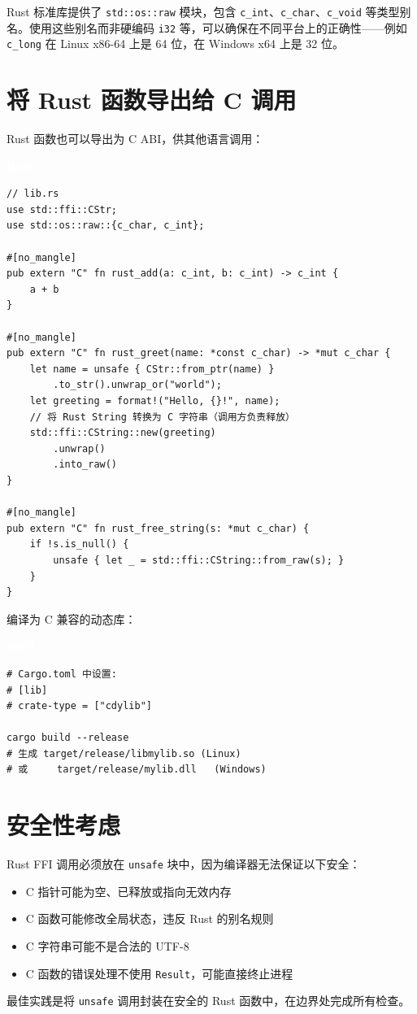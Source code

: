 \documentclass[12pt,a4paper,fontset=fandol]{ctexbook}
\newcommand{\rustlabel}{%
  \begin{tcolorbox}[enhanced,colback=rustheadbg,colframe=rustheadbg,
    arc=1mm,boxrule=0mm,left=6pt,right=6pt,top=2pt,bottom=2pt,
    halign=left,oversize]
    \textcolor{white}{\small\bfseries Rust}
  \end{tcolorbox}\vspace{-4pt}}
\newcommand{\bashlabel}{%
  \begin{tcolorbox}[enhanced,colback=black!80,colframe=black!80,
    arc=1mm,boxrule=0mm,left=6pt,right=6pt,top=2pt,bottom=2pt,
    halign=left,oversize]
    \textcolor{white}{\small\bfseries Shell}
  \end{tcolorbox}\vspace{-4pt}}
\newcommand{\Tp}[1]{\texttt{#1}}
\begin{document}
\begin{tcolorbox}[note={使用 std::os::raw}]
Rust 标准库提供了 \Tp{std::os::raw} 模块，包含 \Tp{c\_int}、\Tp{c\_char}、\Tp{c\_void} 等类型别名。使用这些别名而非硬编码 \Tp{i32} 等，可以确保在不同平台上的正确性——例如 \texttt{c\_long} 在 Linux x86-64 上是 64 位，在 Windows x64 上是 32 位。
\end{tcolorbox}

\section{将 Rust 函数导出给 C 调用}

Rust 函数也可以导出为 C ABI，供其他语言调用：

\rustlabel
\begin{lstlisting}[style=ruststyle]
// lib.rs
use std::ffi::CStr;
use std::os::raw::{c_char, c_int};

#[no_mangle]
pub extern "C" fn rust_add(a: c_int, b: c_int) -> c_int {
    a + b
}

#[no_mangle]
pub extern "C" fn rust_greet(name: *const c_char) -> *mut c_char {
    let name = unsafe { CStr::from_ptr(name) }
        .to_str().unwrap_or("world");
    let greeting = format!("Hello, {}!", name);
    // 将 Rust String 转换为 C 字符串（调用方负责释放）
    std::ffi::CString::new(greeting)
        .unwrap()
        .into_raw()
}

#[no_mangle]
pub extern "C" fn rust_free_string(s: *mut c_char) {
    if !s.is_null() {
        unsafe { let _ = std::ffi::CString::from_raw(s); }
    }
}
\end{lstlisting}

编译为 C 兼容的动态库：

\bashlabel
\begin{lstlisting}[style=bashstyle]
# Cargo.toml 中设置:
# [lib]
# crate-type = ["cdylib"]

cargo build --release
# 生成 target/release/libmylib.so (Linux)
# 或     target/release/mylib.dll   (Windows)
\end{lstlisting}

\section{安全性考虑}

\begin{tcolorbox}[warning={unsafe 的责任}]
Rust FFI 调用必须放在 \texttt{unsafe} 块中，因为编译器无法保证以下安全：
\begin{itemize}[nosep]
\item C 指针可能为空、已释放或指向无效内存
\item C 函数可能修改全局状态，违反 Rust 的别名规则
\item C 字符串可能不是合法的 UTF-8
\item C 函数的错误处理不使用 \Tp{Result}，可能直接终止进程
\end{itemize}
最佳实践是将 \texttt{unsafe} 调用封装在安全的 Rust 函数中，在边界处完成所有检查。
\end{tcolorbox}
\end{document}

